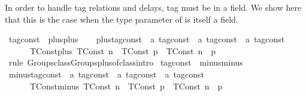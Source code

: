 \begin{isabellebody}
{}
\isamarkuptrue%
%
\endisatagdocument
{\isafolddocument}%
%
\isadelimdocument
%
\endisadelimdocument
%
\begin{isamarkuptext}%
In order to handle tag relations and delays, tag must be in a field.
  We show here that this is the case when the type parameter of  
  is itself a field.%
\end{isamarkuptext}\isamarkuptrue%
\isamarkupfalse%
\ tag{\isacharunderscore}const\ {\isacharcolon}{\isacharcolon}\ {\isacharparenleft}plus{\isacharparenright}plus\isanewline
{}\isanewline
\ \ \isamarkupfalse%
\ plus{\isacharunderscore}tag{\isacharunderscore}const\ {\isacharcolon}{\isacharcolon}\ {\isacartoucheopen}{\isacharprime}a\ tag{\isacharunderscore}const\ {\isasymRightarrow}\ {\isacharprime}a\ tag{\isacharunderscore}const\ {\isasymRightarrow}\ {\isacharprime}a\ tag{\isacharunderscore}const{\isacartoucheclose}\isanewline
\ \ \isanewline
\ \ \ \ \ \ TConst{\isacharunderscore}plus{\isacharcolon}\ {\isacartoucheopen}{\isacharparenleft}TConst\ n{\isacharparenright}\ {\isacharplus}\ {\isacharparenleft}TConst\ p{\isacharparenright}\ {\isacharequal}\ {\isacharparenleft}TConst\ {\isacharparenleft}n\ {\isacharplus}\ p{\isacharparenright}{\isacharparenright}{\isacartoucheclose}\isanewline
\isanewline
\ \ \isamarkupfalse%
%
\isadelimproof
\ %
\endisadelimproof
%
\isatagproof
{}\isamarkupfalse%
\ {\isacharparenleft}rule\ Groups{\isachardot}class{\isachardot}Groups{\isachardot}plus{\isachardot}of{\isacharunderscore}class{\isachardot}intro{\isacharparenright}%
\endisatagproof
{\isafoldproof}%
%
\isadelimproof
%
\endisadelimproof
\isanewline
{}\isamarkupfalse%
\isanewline
\isanewline
{}\isamarkupfalse%
\ tag{\isacharunderscore}const\ {\isacharcolon}{\isacharcolon}\ {\isacharparenleft}minus{\isacharparenright}minus\isanewline
{}\isanewline
\ \ \isamarkupfalse%
\ minus{\isacharunderscore}tag{\isacharunderscore}const\ {\isacharcolon}{\isacharcolon}\ {\isacartoucheopen}{\isacharprime}a\ tag{\isacharunderscore}const\ {\isasymRightarrow}\ {\isacharprime}a\ tag{\isacharunderscore}const\ {\isasymRightarrow}\ {\isacharprime}a\ tag{\isacharunderscore}const{\isacartoucheclose}\isanewline
\ \ \isanewline
\ \ \ \ \ \ TConst{\isacharunderscore}minus{\isacharcolon}\ {\isacartoucheopen}{\isacharparenleft}TConst\ n{\isacharparenright}\ {\isacharminus}\ {\isacharparenleft}TConst\ p{\isacharparenright}\ {\isacharequal}\ {\isacharparenleft}TConst\ {\isacharparenleft}n\ {\isacharminus}\ p{\isacharparenright}{\isacharparenright}{\isacartoucheclose}\isanewline

\end{isabellebody}
